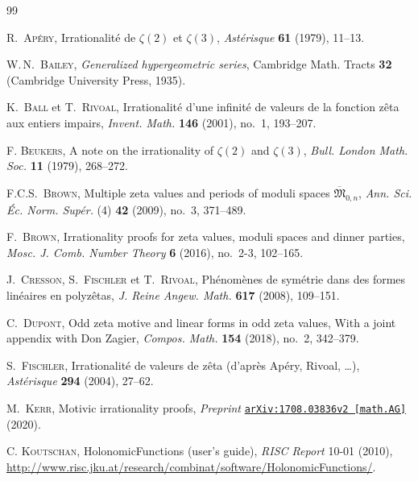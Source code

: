 \documentclass[12pt,reqno]{amsart}
\theoremstyle{remark}
\begin{document}



\begin{thebibliography}{99}

\textsc{R.~Ap\'ery},
Irrationalit\'e de $\zeta(2)$ et $\zeta(3)$,
\emph{Ast\'erisque} \textbf{61} (1979), 11--13. 

\textsc{W.\,N.~Bailey},
\emph{Generalized hypergeometric series},
Cambridge Math. Tracts \textbf{32} (Cambridge University Press, 1935).

\textsc{K.~Ball} et \textsc{T.~Rivoal},
Irrationalit\'e d'une infinit\'e de valeurs de la fonction z\^eta aux entiers impairs,
\emph{Invent. Math.} \textbf{146} (2001), no.~1, 193--207.

\textsc{F. Beukers},
A note on the irrationality of $\zeta(2)$ and $\zeta(3)$,
\emph{Bull. London Math. Soc.} \textbf{11} (1979), 268--272.

\textsc{F.C.S.~Brown},
Multiple zeta values and periods of moduli spaces $\overline{\mathfrak M}_{0,n}$,
\emph{Ann. Sci. \'Ec. Norm. Sup\'er.} (4) \textbf{42} (2009), no.~3, 371--489.

\textsc{F.~Brown},
Irrationality proofs for zeta values, moduli spaces and dinner parties,
\emph{Mosc. J. Comb. Number Theory} \textbf{6} (2016), no.~2-3, 102--165.

\textsc{J.~Cresson}, \textsc{S.~Fischler} et \textsc{T.~Rivoal},
Ph\'enom\`enes de sym\'etrie dans des formes lin\'eaires en polyz\^etas,
\emph{J. Reine Angew. Math.} \textbf{617} (2008), 109--151.

\textsc{C.~Dupont},
Odd zeta motive and linear forms in odd zeta values,
With a joint appendix with Don Zagier,
\emph{Compos. Math.} \textbf{154} (2018), no.~2, 342--379. 

\textsc{S.~Fischler},
Irrationalit\'e de valeurs de z\^eta (d'apr\`es Ap\'ery, Rivoal, \dots),
\emph{Ast\'erisque} \textbf{294} (2004), 27--62.

\textsc{M.~Kerr},
Motivic irrationality proofs,
\emph{Preprint} \href{http://arxiv.org/abs/1708.03836v2}{\texttt{arXiv:1708.03836v2 [math.AG]}} (2020).

\textsc{C. Koutschan},
HolonomicFunctions (user's guide),
\emph{RISC Report} 10-01 (2010),
\url{http://www.risc.jku.at/research/combinat/software/HolonomicFunctions/}.


\end{thebibliography}
\end{document}
